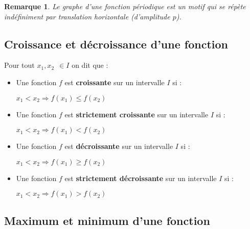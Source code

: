 \documentclass[12pt, a4paper]{book}
\newtheorem*{remarque}{Remarque}
\begin{document}
    \begin{remarque}
        Le graphe d'une fonction périodique est un motif qui se répète indéfiniment par translation horizontale (d'amplitude $p$).
    \end{remarque}

\subsection{Croissance et décroissance d'une fonction}

Pour tout $ x_1, x_2\ \ \in I$ on dit que :
\begin{itemize}
    \item  Une fonction $f$ est \textbf{croissante} sur un intervalle $I$ si :
    \begin{center}
        $x_1 < x_2 \Rightarrow f(x_1) \leq f(x_2)$
    \end{center}
    

    \item  Une fonction $f$ est \textbf{strictement croissante} sur un intervalle $I$ si :
    \begin{center}
        $x_1 < x_2 \Rightarrow f(x_1) < f(x_2)$
    \end{center}
   

    \item  Une fonction $f$ est \textbf{décroissante} sur un intervalle $I$ si :
    \begin{center}
        $x_1 < x_2 \Rightarrow f(x_1) \geq f(x_2)$
    \end{center}
   

    \item  Une fonction $f$ est \textbf{strictement décroissante} sur un intervalle $I$ si :
    \begin{center}
        $x_1 < x_2 \Rightarrow f(x_1) > f(x_2)$
    \end{center}
    
\end{itemize}
\newpage

\subsection{Maximum et minimum d'une fonction}
\end{document}
